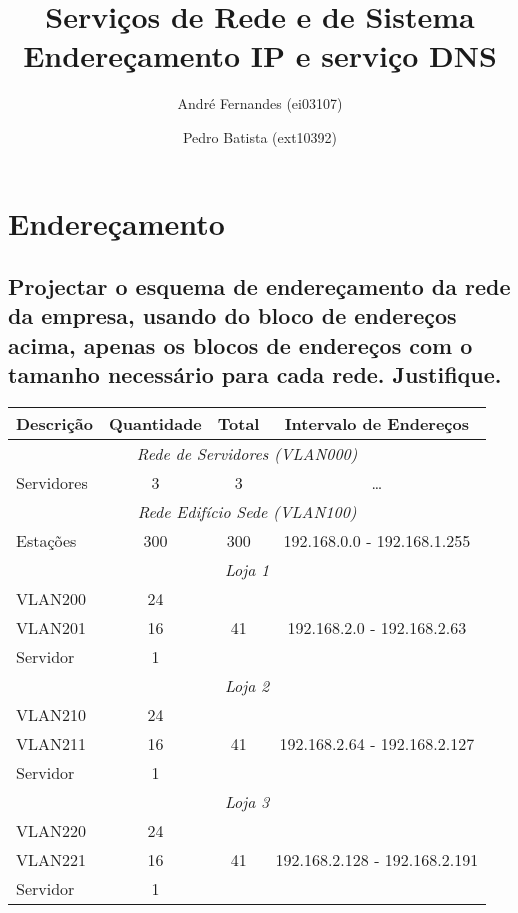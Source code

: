 \documentclass[a4paper,12pt]{article}
\title{Serviços de Rede e de Sistema \\
Endereçamento IP e serviço DNS}
\author{André Fernandes (ei03107) \and Pedro Batista (ext10392)}
\begin{document}
\maketitle

\section{Endereçamento}
\subsection{Projectar o esquema de endereçamento da rede da empresa,
usando do bloco de endereços acima, apenas os blocos de endereços com
o tamanho necessário para cada rede. Justifique.}

\begin{table}[h]
   \centering
   \begin{tabular}{ l | c | c | c }
      \toprule
      \textbf{Descrição} & \textbf{Quantidade} & \textbf{Total} & \textbf{Intervalo de Endereços} \\\hline

      \multicolumn{4}{c}{\textit{Rede de Servidores (VLAN000)}} \\\hline
      Servidores & 3 & 3 & \ldots \\\hline

      \multicolumn{4}{c}{\textit{Rede Edifício Sede (VLAN100)}} \\ \hline
      Estações & 300 & 300 & 192.168.0.0 - 192.168.1.255 \\ \hline

      \multicolumn{4}{c}{\textit{Loja 1 }} \\\hline
      VLAN200 & 24 & \multirow{3}{*}{41} & \multirow{3}{*}{192.168.2.0 - 192.168.2.63} \\\cline{1-2}
      VLAN201 & 16 & \\\cline{1-2}
      Servidor & 1 & \\ \hline
      \multicolumn{4}{c}{\textit{Loja 2}} \\\hline
      VLAN210 & 24 & \multirow{3}{*}{41} & \multirow{3}{*}{192.168.2.64 - 192.168.2.127} \\\cline{1-2}
      VLAN211 & 16 & \\\cline{1-2}
      Servidor & 1 & \\ \hline
      \multicolumn{4}{c}{\textit{Loja 3}} \\\hline
      VLAN220 & 24 & \multirow{3}{*}{41} & \multirow{3}{*}{192.168.2.128 - 192.168.2.191} \\\cline{1-2}
      VLAN221 & 16 & \\\cline{1-2}
      Servidor & 1 & \\ \hline


\end{tabular}
\end{table}
\end{document}
